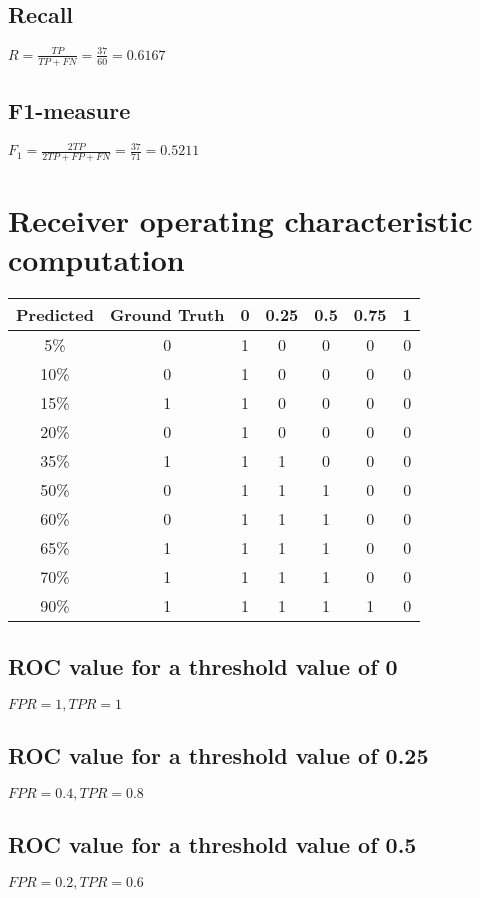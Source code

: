 \documentclass{article}
\begin{document}
\subsection{Recall}
$\displaystyle R=\frac{TP}{TP+FN}=\frac{37}{60}=0.6167$

\subsection{F1-measure}
$\displaystyle F_1=\frac{2TP}{2TP+FP+FN}=\frac{37}{71}=0.5211$

\clearpage
\section{Receiver operating characteristic computation}
\begin{tabular}{c|c|ccccc}
Predicted & Ground Truth & 0 & 0.25 & 0.5 & 0.75 & 1 \\ \hline
5\%       & 0            & 1 & 0    & 0   & 0    & 0 \\
10\%      & 0            & 1 & 0    & 0   & 0    & 0 \\
15\%      & 1            & 1 & 0    & 0   & 0    & 0 \\
20\%      & 0            & 1 & 0    & 0   & 0    & 0 \\
35\%      & 1            & 1 & 1    & 0   & 0    & 0 \\
50\%      & 0            & 1 & 1    & 1   & 0    & 0 \\
60\%      & 0            & 1 & 1    & 1   & 0    & 0 \\
65\%      & 1            & 1 & 1    & 1   & 0    & 0 \\
70\%      & 1            & 1 & 1    & 1   & 0    & 0 \\
90\%      & 1            & 1 & 1    & 1   & 1    & 0
\end{tabular}

\subsection{ROC value for a threshold value of 0}
$FPR=1,TPR=1$
\subsection{ROC value for a threshold value of 0.25}
$FPR=0.4,TPR=0.8$
\subsection{ROC value for a threshold value of 0.5}
$FPR=0.2,TPR=0.6$
\end{document}
